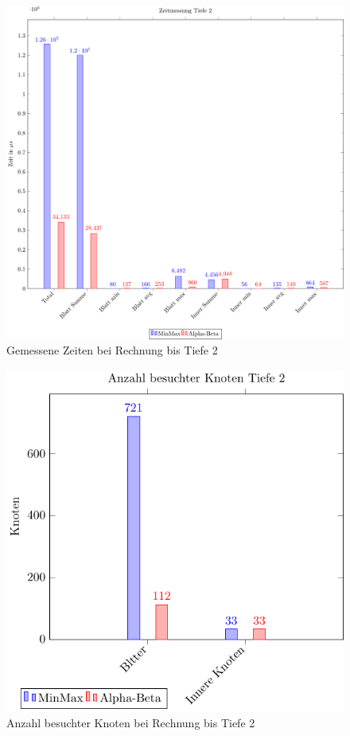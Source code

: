      \begin{figure}[h]
      \centering
      \includegraphics[width=\textwidth]{figures/time-2.pdf} 
      \caption{Gemessene Zeiten bei Rechnung bis Tiefe 2}
      \label{fig:time-2}
    \end{figure}
    \begin{figure}[h]
      \centering
      \includegraphics[width=\textwidth]{figures/node-2.pdf} 
      \caption{Anzahl besuchter Knoten bei Rechnung bis Tiefe 2}
      \label{fig:node-2}
    \end{figure}
    
